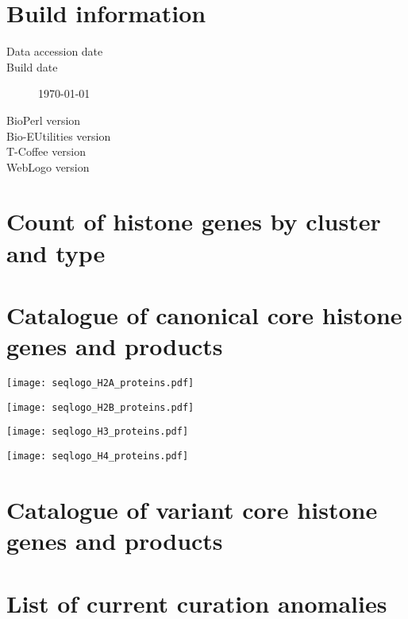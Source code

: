 \documentclass[a4paper,oneside,onecolumn,article]{memoir}
\begin{document}
  \section*{Build information}
  \begin{description}
    \item[Data accession date] \hfill \newline
      \printdate{\SequencesDate}
    \item[Build date] \hfill \newline
      \today
    \item[BioPerl version] \hfill \newline
      \BioPerlVersion{}
    \item[Bio-EUtilities version] \hfill \newline
      \BioEUtilitiesVersion
    \item[T-Coffee version] \hfill \newline
      \TCoffeVersion
    \item[WebLogo version] \hfill \newline
      \WebLogoVersion
  \end{description}

  \section*{Count of histone genes by cluster and type}
  

  \newpage
  \section*{Catalogue of canonical core histone genes and products}
  

  \newpage
  
  \texttt{[image: seqlogo\_H2A\_proteins.pdf]}

  \newpage
  
  \texttt{[image: seqlogo\_H2B\_proteins.pdf]}

  \newpage
  
  \texttt{[image: seqlogo\_H3\_proteins.pdf]}

  \newpage
  
  \texttt{[image: seqlogo\_H4\_proteins.pdf]}

  \newpage
  \section*{Catalogue of variant core histone genes and products}
  

  \newpage
  \section*{List of current curation anomalies}
  \begin{itemize}
  
  \end{itemize}
\end{document}
